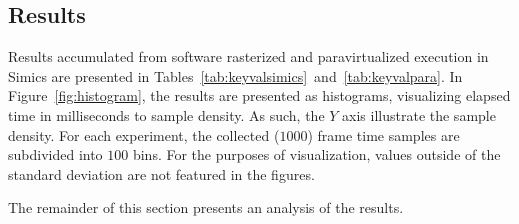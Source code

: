 \subsection{Results}
\label{sec:results}
Results accumulated from software rasterized and paravirtualized execution in Simics are presented in Tables~\ref{tab:keyvalsimics}~and~\ref{tab:keyvalpara}.
In Figure~\ref{fig:histogram}, the results are presented as histograms, visualizing elapsed time in milliseconds to sample density.
As such, the $Y$ axis illustrate the sample density.
For each experiment, the collected ($1000$) frame time samples are subdivided into $100$ bins.
For the purposes of visualization, values outside of the standard deviation are not featured in the figures.

The remainder of this section presents an analysis of the results.

\providecommand{\chesskeyone}{$60\times60$ tiles}
\providecommand{\chesskeytwo}{$84\times84$ tiles}
\providecommand{\chesskeythree}{$118\times118$ tiles}

\providecommand{\juliakeyone}{$225$ iterations}
\providecommand{\juliakeytwo}{$450$ iterations}
\providecommand{\juliakeythree}{$900$ iterations}

